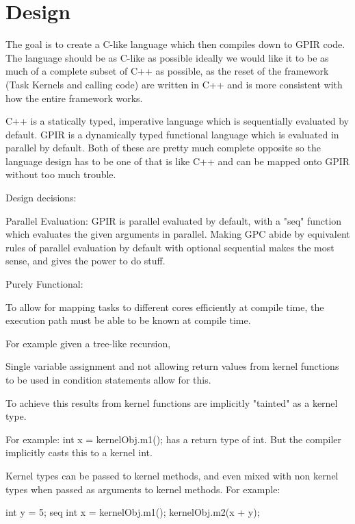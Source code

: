 \chapter{Design}

The goal is to create a C-like language which then compiles down to GPIR code.
The language should be as C-like as possible ideally we would like it to be as much
of a complete subset of C++ as possible, as the reset of the framework (Task Kernels and calling code)
are written in C++ and is more consistent with how the entire framework works.

C++ is a statically typed, imperative language which is sequentially evaluated by default.
GPIR is a dynamically typed functional language which is evaluated in parallel by default.
Both of these are pretty much complete opposite so the language design has to be one of that
is like C++ and can be mapped onto GPIR without too much trouble.

Design decisions:

    Parallel Evaluation:
        GPIR is parallel evaluated by default, with a "seq" function which
        evaluates the given arguments in parallel. Making GPC abide by equivalent rules of parallel
        evaluation by default with optional sequential makes the most sense, and gives the
        power to do stuff. 

    Purely Functional:
        
        To allow for mapping tasks to different cores efficiently
        at compile time, the execution path must be able
        to be known at compile time. 
        
        For example given a tree-like
        recursion, 
        
        Single variable assignment
        and not allowing return values from kernel functions
        to be used in condition statements allow for this.

        To achieve this results from kernel functions are implicitly
        "tainted" as a kernel type.

        For example:
            int x = kernelObj.m1();
        has a return type of int.
        But the compiler implicitly casts this to a 
        kernel int.

        Kernel types can be passed to kernel methods, and even
        mixed with non kernel types when passed as arguments to
        kernel methods. For example:

        int y = 5;
        seq {
            int x = kernelObj.m1();
            kernelObj.m2(x + y);
        }

